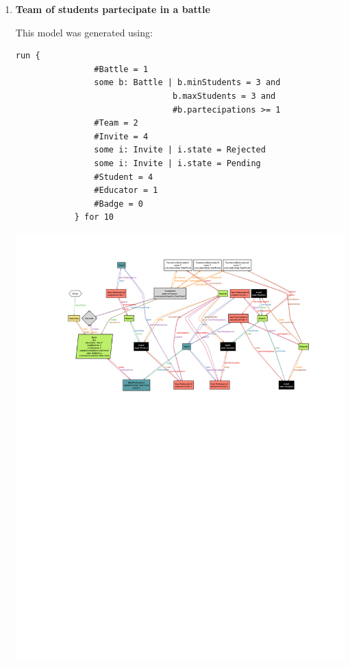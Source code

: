 \begin{enumerate}[label=,leftmargin=0cm]
      \item \textbf{Team of students partecipate in a battle}

            This model was generated using:
            \begin{lstlisting}[language=alloy]
            run {
                #Battle = 1 
                some b: Battle | b.minStudents = 3 and 
                                b.maxStudents = 3 and 
                                #b.partecipations >= 1
                #Team = 2
                #Invite = 4
                some i: Invite | i.state = Rejected
                some i: Invite | i.state = Pending
                #Student = 4
                #Educator = 1
                #Badge = 0
            } for 10
          \end{lstlisting}

            \begin{adjustbox}{max size={\textwidth}{\textheight}}
                  \includegraphics[trim=90 475 60 40, clip]{alloy/invites.pdf}
            \end{adjustbox}


\end{enumerate}
